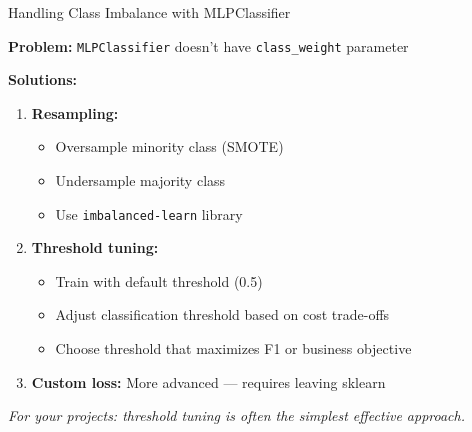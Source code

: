\documentclass[10pt]{beamer}
\begin{document}
\begin{frame}{Handling Class Imbalance with MLPClassifier}

  \textbf{Problem:} \texttt{MLPClassifier} doesn't have \texttt{class\_weight} parameter

  \vspace{1em}
  \textbf{Solutions:}
  \begin{enumerate}
    \item \textbf{Resampling:}
    \begin{itemize}
      \item Oversample minority class (SMOTE)
      \item Undersample majority class
      \item Use \texttt{imbalanced-learn} library
    \end{itemize}

    \vspace{0.5em}
    \item \textbf{Threshold tuning:}
    \begin{itemize}
      \item Train with default threshold (0.5)
      \item Adjust classification threshold based on cost trade-offs
      \item Choose threshold that maximizes F1 or business objective
    \end{itemize}

    \vspace{0.5em}
    \item \textbf{Custom loss:} More advanced --- requires leaving sklearn
  \end{enumerate}

  \vspace{0.5em}
  \textit{For your projects: threshold tuning is often the simplest effective approach.}
\end{frame}

\end{document}
